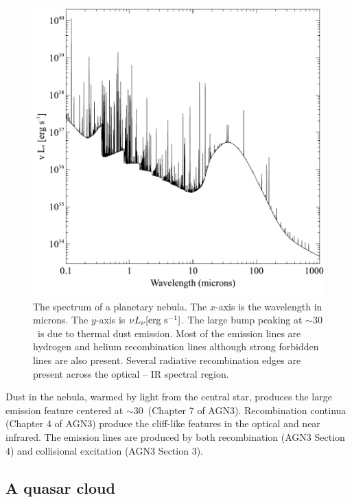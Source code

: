 \documentclass[12pt,twoside]{article}
\begin{document}
\begin{figure}
\begin{center}
\includegraphics[clip=on,width=0.8\columnwidth,height=0.8\textheight,keepaspectratio]{PN_spectrum}
\end{center}
\caption{The spectrum of a planetary nebula.
The $x$-axis is the wavelength in microns.
The $y$-axis is $\nu L_\nu \rm{[erg\ s^{-1}]}$.
The large bump peaking at $\sim 30$\micron\ is
due to thermal dust emission.
Most of the emission lines are hydrogen and helium recombination lines
although strong forbidden lines are also present.
Several radiative recombination edges are present
across the optical -- IR spectral region.}
\label{fig:PN_spectrum}
\end{figure}

Dust in the nebula, warmed by light from the central star, produces the
large emission feature centered at $\sim 30$\micron\ (Chapter 7 of AGN3).
Recombination continua (Chapter 4 of AGN3) produce the cliff-like features
in the optical and near infrared.  The emission lines are produced by both
recombination (AGN3 Section 4) and collisional excitation (AGN3 Section
3).

\subsection{A quasar cloud}
\label{sec:QuasarCloud}
\end{document}
